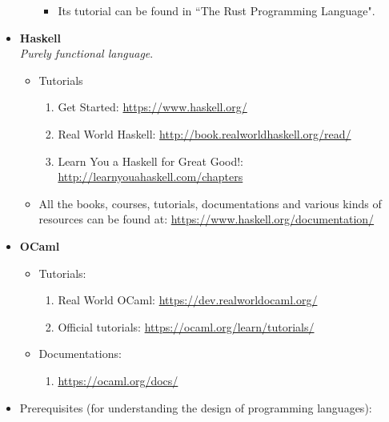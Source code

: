 \documentclass{article}
\begin{document}
\begin{itemize}
\begin{itemize}
\begin{itemize}
            \item Its tutorial can be found in ``The Rust Programming Language".
        \end{itemize}
    \end{itemize}
    \item \textbf{Haskell}\\
    \emph{Purely functional language}.
    \begin{itemize}
        \item Tutorials
        \begin{enumerate}
            \item Get Started:
            \href{https://www.haskell.org/}{https://www.haskell.org/}
            \item Real World Haskell:
            \href{http://book.realworldhaskell.org/read/}{http://book.realworldhaskell.org/read/}
            \item Learn You a Haskell for Great Good!:
            \href{http://learnyouahaskell.com/chapters}{http://learnyouahaskell.com/chapters}
        \end{enumerate}
        \item All the books, courses, tutorials, documentations and various kinds of resources can be found at:
        \href{https://www.haskell.org/documentation/}{https://www.haskell.org/documentation/}
    \end{itemize}
    \item \textbf{OCaml}
    \begin{itemize}
        \item Tutorials:
        \begin{enumerate}
            \item Real World OCaml:
            \href{https://dev.realworldocaml.org/}{https://dev.realworldocaml.org/}
            \item Official tutorials: \href{https://ocaml.org/learn/tutorials/}{https://ocaml.org/learn/tutorials/}
        \end{enumerate}
        \item Documentations:
        \begin{enumerate}
            \item \href{https://ocaml.org/docs/}{https://ocaml.org/docs/}
        \end{enumerate}        
    \end{itemize}
    \item Prerequisites (for understanding the design of programming languages):
    \begin{itemize}

\end{itemize}
\end{itemize}
\end{document}
